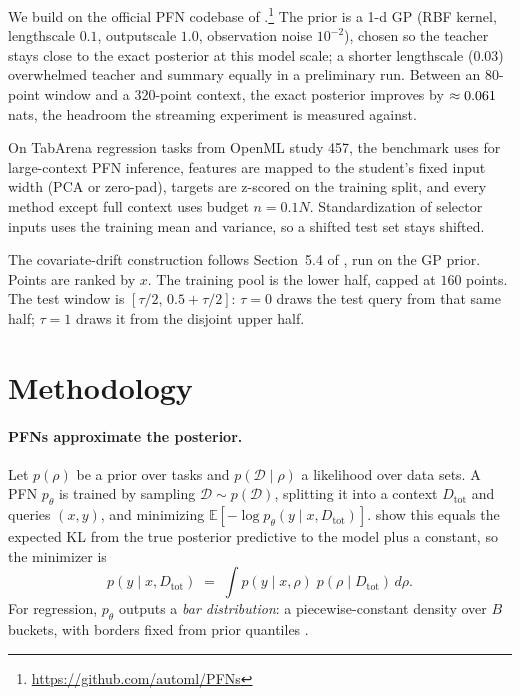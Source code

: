 \documentclass{article}
\newcommand{\Dtot}{D_{\mathrm{tot}}}
\begin{document}
We build on the official PFN codebase of
\citet{muller2022pfn}.\footnote{\url{https://github.com/automl/PFNs}} The
prior is a 1-d GP (RBF kernel, lengthscale $0.1$, outputscale $1.0$,
observation noise $10^{-2}$), chosen so the teacher stays close to the
exact posterior at this model scale; a shorter lengthscale ($0.03$)
overwhelmed teacher and summary equally in a preliminary run. Between an
$80$-point window and a $320$-point context, the exact posterior improves
by $\approx0.061{}$ nats, the headroom the streaming experiment
is measured against.

On TabArena regression tasks from OpenML study 457, the benchmark
\citet{heredge2026crumb} uses for large-context PFN inference, features are mapped to the student's fixed
input width (PCA or zero-pad), targets are z-scored on the training split,
and every method except full context uses budget $n = 0.1N$. Standardization of
selector inputs uses the training mean and variance, so a shifted test set stays shifted.

The covariate-drift construction follows Section~5.4 of
\citet{heredge2026crumb}, run on the GP prior.
Points are ranked by $x$. The training pool is the lower half, capped at $160$ points.
The test window is $[ \tau/2,\, 0.5 + \tau/2 ]$: $\tau = 0$ draws the test query
from that same half; $\tau = 1$ draws it from the disjoint upper half.

\section{Methodology}
\label{sec:method}

\paragraph{PFNs approximate the posterior.} Let $p(\rho)$ be a prior over
tasks and $p(\mathcal{D} \mid \rho)$ a likelihood over data sets. A PFN
$p_\theta$ is trained by sampling $\mathcal{D} \sim p(\mathcal{D})$,
splitting it into a context $\Dtot$ and queries $(x, y)$, and minimizing
$\mathbb{E}[-\log p_\theta(y \mid x, \Dtot)]$. \citet{muller2022pfn} show
this equals the expected KL from the true posterior predictive to the
model plus a constant, so the minimizer is
\begin{equation}
\label{eq:ppd}
  p(y \mid x, \Dtot) \;=\; \int p(y \mid x, \rho)\; p(\rho \mid \Dtot)\, d\rho .
\end{equation}
For regression, $p_\theta$ outputs a \emph{bar distribution}: a
piecewise-constant density over $B$ buckets, with borders fixed from prior
quantiles \citep{muller2022pfn}.
\end{document}
